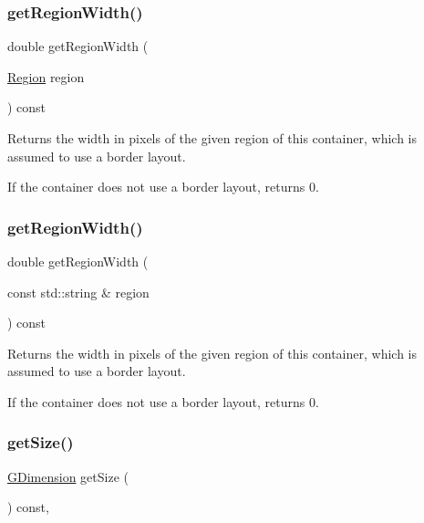 \subsubsection{\texorpdfstring{get\+Region\+Width()}{getRegionWidth()}\hspace{0.1cm}{\footnotesize\ttfamily [1/2]}}
{\footnotesize\ttfamily double get\+Region\+Width (\begin{DoxyParamCaption}\item[{\mbox{\hyperlink{classGContainer_a81a01a86de31071a92e6cce0bab9bc4b}{Region}}}]{region }\end{DoxyParamCaption}) const\hspace{0.3cm}{\ttfamily [virtual]}}



Returns the width in pixels of the given region of this container, which is assumed to use a border layout. 

If the container does not use a border layout, returns 0. \mbox{\label{classGContainer_ab169dab454fc90f1c845b91b4e1a8a14}} 
\subsubsection{\texorpdfstring{get\+Region\+Width()}{getRegionWidth()}\hspace{0.1cm}{\footnotesize\ttfamily [2/2]}}
{\footnotesize\ttfamily double get\+Region\+Width (\begin{DoxyParamCaption}\item[{const std\+::string \&}]{region }\end{DoxyParamCaption}) const\hspace{0.3cm}{\ttfamily [virtual]}}



Returns the width in pixels of the given region of this container, which is assumed to use a border layout. 

If the container does not use a border layout, returns 0. \mbox{\label{classGInteractor_a7b4eec96a2bdc6420695d5796a78eea9}} 
\subsubsection{\texorpdfstring{get\+Size()}{getSize()}}
{\footnotesize\ttfamily \mbox{\hyperlink{structGDimension}{G\+Dimension}} get\+Size (\begin{DoxyParamCaption}{ }\end{DoxyParamCaption}) const\hspace{0.3cm}{\ttfamily [virtual]}, {\ttfamily [inherited]}}



